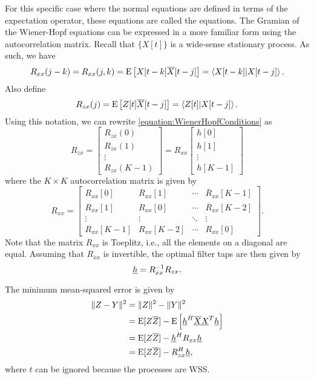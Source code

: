 For this specific case where the normal equations are defined in terms of the expectation operator, these equations are called the  equations.
The Gramian of the Wiener-Hopf equations can be expressed in a more familiar form using the autocorrelation matrix.
Recall that $\{ X[t] \}$ is a wide-sense stationary process.
As such, we have
\begin{equation*}
R_{xx} (j-k) = R_{xx} (j, k) = \mathrm{E} \left[ X[t-k] \overline{X}[t-j] \right]
= \left\langle X[t-k] | X[t-j] \right\rangle .
\end{equation*}
Also define
\begin{equation*}
R_{zx}(j) = \mathrm{E} \left[ Z[t] \overline{X}[t-j] \right]
= \left\langle Z[t] | X[t-j] \right\rangle .
\end{equation*}
Using this notation, we can rewrite \eqref{equation:WienerHopfConditions} as
\begin{equation*}
R_{zx} = \begin{bmatrix}
R_{zx} (0) \\ R_{zx} (1) \\ \vdots \\ R_{zx} (K-1) \end{bmatrix}
= R_{xx}
\begin{bmatrix}
h [0] \\
h [1] \\ \vdots \\
h [K-1] \end{bmatrix}
\end{equation*}
where the $K \times K$ autocorrelation matrix is given by
\begin{equation*}
R_{xx} = \begin{bmatrix}
R_{xx} [0] & \overline{R}_{xx}[1] & \cdots & \overline{R}_{xx}[K-1] \\
R_{xx} [1] & R_{xx}[0] & \cdots & \overline{R}_{xx}[K-2] \\
\vdots & \vdots & \ddots & \vdots \\
R_{xx} [K-1] & R_{xx}[K-2] & \cdots & R_{xx}[0]
\end{bmatrix} .
\end{equation*}
Note that the matrix $R_{xx}$ is Toeplitz, i.e., all the elements on a diagonal are equal.
Assuming that $R_{xx}$ is invertible, the optimal filter taps are then given by
\begin{equation*}
\underline{h} = R_{xx}^{-1} R_{zx}.
\end{equation*}

The minimum mean-squared error is given by
\begin{equation*}
\begin{split}
\| Z-Y \|^2 &= \| Z \|^2 - \| Y \|^2 \\
&= \mathrm{E} [Z \overline{Z}] - \mathrm{E} \left[ \underline{h}^H \overline{\underline{X}} \underline{X}^T \underline{h} \right] \\
&= \mathrm{E} [Z \overline{Z}] - \underline{h}^H R_{xx} \underline{h} \\
&= \mathrm{E} [Z \overline{Z}] - R_{zx}^H \underline{h} ,
\end{split}
\end{equation*}
where $t$ can be ignored because the processes are WSS.

